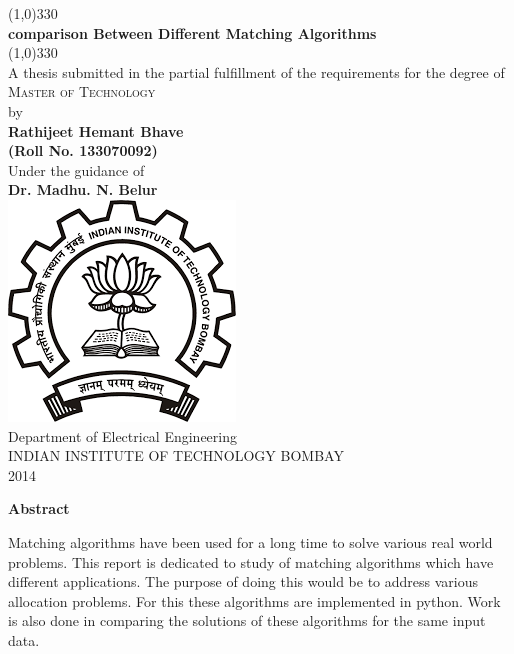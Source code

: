 \documentclass[a4paper]{report}
\theoremstyle{definition}
\begin{document}
\begin{titlepage}
\begin{center}
\line(1,0){330}\\
[0.3cm]
\LARGE{\bfseries comparison Between Different Matching Algorithms}\\
\line(1,0){330}\\
[0.5cm]
\large A thesis submitted in the partial fulfillment of the requirements for the degree of\\
[0.5cm]
\textsc{\large Master of Technology}\\
[1cm]

by\\
[1cm]
\textbf{Rathijeet Hemant Bhave \\
(Roll No. 133070092)}\\
[2cm]
Under the guidance of\\
\textbf{Dr. Madhu. N. Belur}\\
[2cm]
\includegraphics[scale=0.4]{logo}\\
[2cm]
Department of Electrical Engineering\\
INDIAN INSTITUTE OF TECHNOLOGY BOMBAY\\
2014

\end{center}
\end{titlepage}
\thispagestyle{plain}
\begin{center}


\textbf{\Large Abstract}
\end{center}
\vspace*{2cm}
Matching algorithms have been used for a long time to solve various real world problems. This report is dedicated to study of matching algorithms which have different applications. The purpose of doing this would be to address various allocation problems. For this these algorithms are implemented in python. Work is also done in comparing the solutions of these algorithms for the same input data.
\end{document}
